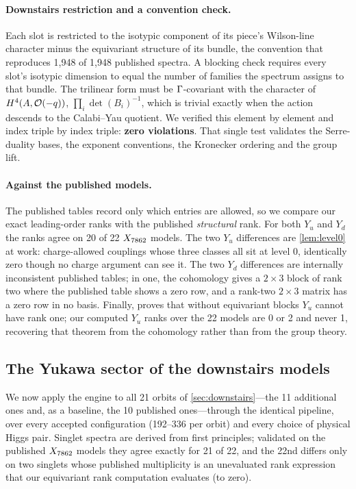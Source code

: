 \paragraph{Downstairs restriction and a convention check.} Each slot is
restricted to the isotypic component of its piece's Wilson-line character minus
the equivariant structure of its bundle, the convention that reproduces 1,948 of
1,948 published spectra. A blocking check requires every slot's isotypic
dimension to equal the number of families the spectrum assigns to that bundle.
The trilinear form must be $\Gamma$-covariant with the character of
$H^4(A,\mathcal{O}(-q))$, $\prod_i\det(B_i)^{-1}$, which is trivial exactly when the action
descends to the Calabi--Yau quotient. We verified this element by element and
index triple by index triple: \textbf{zero violations}. That single test
validates the Serre-duality bases, the exponent conventions, the Kronecker
ordering and the group lift.

\paragraph{Against the published models.} The published tables record only
which entries are allowed, so we compare our exact leading-order ranks with the
published \emph{structural} rank. For both $Y_u$ and $Y_d$ the ranks agree on
20 of 22 $X_{7862}$ models. The two $Y_u$ differences are \cref{lem:level0} at work:
charge-allowed couplings whose three classes all sit at level 0, identically zero
though no charge argument can see it. The two $Y_d$ differences are internally
inconsistent published tables; in one, the cohomology gives a $2\times3$ block of
rank two where the published table shows a zero row, and a rank-two $2\times3$
matrix has a zero row in no basis. Finally, \cite[Sec.~6.2]{AGLP2012} proves that
without equivariant blocks $Y_u$ cannot have rank one; our computed $Y_u$ ranks
over the 22 models are 0 or 2 and never 1, recovering that theorem from the
cohomology rather than from the group theory.

\subsection{The Yukawa sector of the downstairs models}

We now apply the engine to all 21 orbits of \cref{sec:downstairs}---the 11
additional ones and, as a baseline, the 10 published ones---through the
identical pipeline, over every accepted configuration (192--336 per orbit) and
every choice of physical Higgs pair. Singlet spectra are derived from first
principles; validated on the published $X_{7862}$ models they agree exactly for 21
of 22, and the 22nd differs only on two singlets whose published multiplicity is
an unevaluated rank expression that our equivariant rank computation evaluates
(to zero).

